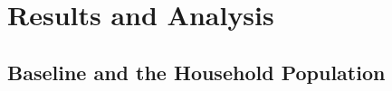 \section{Results and Analysis}
\label{ch:results}

%
%
%
%

\subsection{Baseline and the Household Population}
\label{sec:results-baseline}

%

